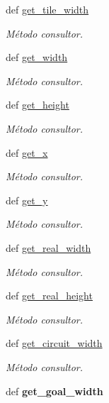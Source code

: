 \begin{DoxyCompactItemize}
def \hyperlink{classengine_1_1circuit_1_1Circuit_a35626a1d3e24d2826cbc61e51fe917ab}{get\-\_\-tile\-\_\-width}
\begin{DoxyCompactList}\small\item\em \-Método consultor. \end{DoxyCompactList}\item 
def \hyperlink{classengine_1_1circuit_1_1Circuit_a9ea364ba3d3ac37b68bb3cadff36a525}{get\-\_\-width}
\begin{DoxyCompactList}\small\item\em \-Método consultor. \end{DoxyCompactList}\item 
def \hyperlink{classengine_1_1circuit_1_1Circuit_ae75ed3117d7f651b89ea354193f86f36}{get\-\_\-height}
\begin{DoxyCompactList}\small\item\em \-Método consultor. \end{DoxyCompactList}\item 
def \hyperlink{classengine_1_1circuit_1_1Circuit_a9942a8008402ae4ed6b6be23168ff842}{get\-\_\-x}
\begin{DoxyCompactList}\small\item\em \-Método consultor. \end{DoxyCompactList}\item 
def \hyperlink{classengine_1_1circuit_1_1Circuit_a49c5b56c33f6884fa6ee8e436132d588}{get\-\_\-y}
\begin{DoxyCompactList}\small\item\em \-Método consultor. \end{DoxyCompactList}\item 
def \hyperlink{classengine_1_1circuit_1_1Circuit_a89fca06009ff3f1e0db3404ad07b9540}{get\-\_\-real\-\_\-width}
\begin{DoxyCompactList}\small\item\em \-Método consultor. \end{DoxyCompactList}\item 
def \hyperlink{classengine_1_1circuit_1_1Circuit_aba9c4b201602e4a273b84107a3d5df91}{get\-\_\-real\-\_\-height}
\begin{DoxyCompactList}\small\item\em \-Método consultor. \end{DoxyCompactList}\item 
def \hyperlink{classengine_1_1circuit_1_1Circuit_aca6143d631e81fa6481f2fc18836b12d}{get\-\_\-circuit\-\_\-width}
\begin{DoxyCompactList}\small\item\em \-Método consultor. \end{DoxyCompactList}\item 
\hypertarget{classengine_1_1circuit_1_1Circuit_a0036029ddd347333ca0ee141e672b236}{
def {\bfseries get\-\_\-goal\-\_\-width}}
\label{classengine_1_1circuit_1_1Circuit_a0036029ddd347333ca0ee141e672b236}

\end{DoxyCompactItemize}
